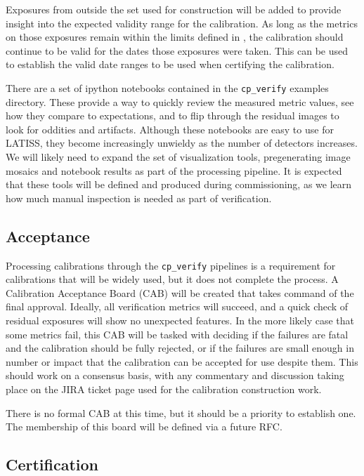 \documentclass[DM,authoryear,toc]{lsstdoc}
\begin{document}
Exposures from outside the set used for construction will be added to provide insight into the expected validity range for the calibration.  As long as the metrics on those exposures remain within the limits defined in , the calibration should continue to be valid for the dates those exposures were taken.  This can be used to establish the valid date ranges to be used when certifying the calibration.

There are a set of ipython notebooks contained in the \verb|cp_verify| examples directory.  These provide a way to quickly review the measured metric values, see how they compare to expectations, and to flip through the residual images to look for oddities and artifacts.  Although these notebooks are easy to use for LATISS, they become increasingly unwieldy as the number of detectors increases.  We will likely need to expand the set of visualization tools, pregenerating image mosaics and notebook results as part of the processing pipeline.  It is expected that these tools will be defined and produced during commissioning, as we learn how much manual inspection is needed as part of verification.

\subsection{Acceptance}

Processing calibrations through the \verb|cp_verify| pipelines is a requirement for calibrations that will be widely used, but it does not complete the process.  A Calibration Acceptance Board (CAB) will be created that takes command of the final approval.  Ideally, all verification metrics will succeed, and a quick check of residual exposures will show no unexpected features.  In the more likely case that some metrics fail, this CAB will be tasked with deciding if the failures are fatal and the calibration should be fully rejected, or if the failures are small enough in number or impact that the calibration can be accepted for use despite them.  This should work on a consensus basis, with any commentary and discussion taking place on the JIRA ticket page used for the calibration construction work.

There is no formal CAB at this time, but it should be a priority to establish one.  The membership of this board will be defined via a future RFC.

\subsection{Certification}
\end{document}
